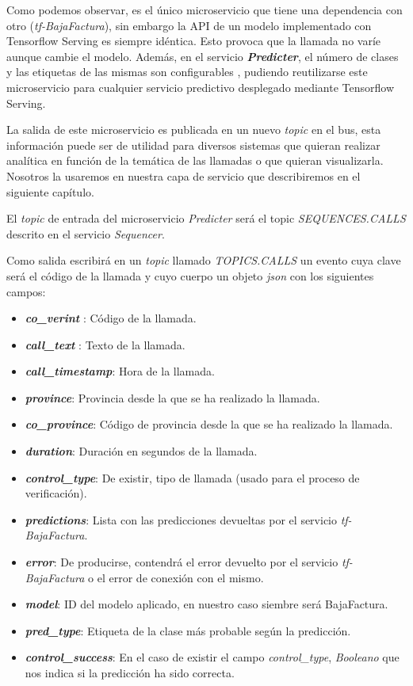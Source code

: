 Como podemos observar, es el único microservicio que tiene una dependencia con otro (\textit{tf-BajaFactura}), sin embargo la API de un modelo implementado con Tensorflow Serving \cite{tfserving} es siempre idéntica. Esto provoca que la llamada no varíe aunque cambie el modelo. Además, en el servicio \textit{\textbf{Predicter}}, el número de clases y las etiquetas de las mismas son configurables , pudiendo  reutilizarse este microservicio para cualquier servicio predictivo desplegado mediante  Tensorflow Serving.

La salida de este microservicio es publicada en un nuevo \textit{topic} en el bus, esta información puede ser de utilidad para diversos sistemas que quieran realizar analítica en función de la temática de las llamadas o que quieran visualizarla. Nosotros la usaremos en nuestra capa de servicio que describiremos en el siguiente capítulo.

El \textit{topic} de entrada del microservicio \textit{Predicter} será el topic  \textit{SEQUENCES.CALLS} descrito en el servicio \textit{Sequencer}. 


Como salida escribirá en un \textit{topic}  llamado \textit{TOPICS.CALLS} un evento cuya clave será el código de la llamada y cuyo cuerpo un objeto \textit{json} con los siguientes campos:

\begin{itemize}
		\item \textbf{\textit{co\_verint}} : Código de la llamada. 
		\item  \textbf{\textit{call\_text}} : Texto de la llamada. 
		\item  \textbf{\textit{call\_timestamp}}: Hora de la llamada.
        \item \textbf{\textit{province}}: Provincia desde la que se ha realizado la llamada. 
        \item \textbf{\textit{co\_province}}: Código de provincia desde la que se ha realizado la llamada. 
        \item \textbf{\textit{duration}}: Duración en segundos de la llamada. 
        \item \textbf{\textit{control\_type}}: De existir, tipo de llamada (usado para el proceso de verificación).  
        \item  \textbf{\textit{predictions}}: Lista con las predicciones devueltas por el servicio  \textit{tf-BajaFactura}. 
        \item  \textbf{\textit{error}}: De producirse, contendrá el error devuelto por el  servicio  \textit{tf-BajaFactura} o el error de conexión con el mismo.      
         \item  \textbf{\textit{model}}: ID del modelo aplicado, en nuestro caso siembre será BajaFactura.
         \item  \textbf{\textit{pred\_type}}: Etiqueta de la clase más probable según la predicción.
         \item  \textbf{\textit{control\_success}}: En el caso de existir el campo \textit{control\_type}, \textit{Booleano} que nos indica si la predicción ha sido correcta.
\end{itemize} 


